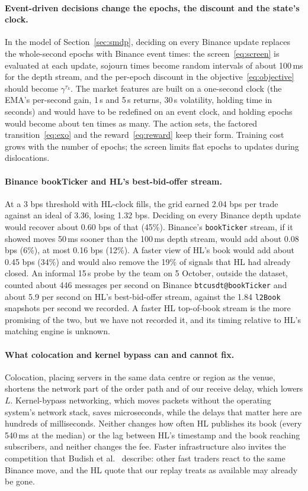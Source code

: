 \documentclass[12pt,a4paper]{article}
\DeclareRobustCommand{\bps}{\ifmmode\,\text{bps}\else\,bps\fi}
\begin{document}
\paragraph{Event-driven decisions change the epochs, the discount and the state's clock.} In
the model of Section~\ref{sec:smdp}, deciding on every Binance update replaces the
whole-second epochs with Binance event times: the screen~\eqref{eq:screen} is evaluated at each
update, sojourn times become random intervals of about 100\,ms for the depth stream, and the
per-epoch discount in the objective~\eqref{eq:objective} should become $\gamma^{\tau_k}$. The
market features are built on a one-second clock (the EMA's per-second gain, 1\,s and 5\,s
returns, 30\,s volatility, holding time in seconds) and would have to be redefined on an event
clock, and holding epochs would become about ten times as many. The action sets, the factored
transition~\eqref{eq:exo} and the reward~\eqref{eq:reward} keep their form. Training cost grows
with the number of epochs; the screen limits flat epochs to updates during dislocations.

\paragraph{Binance bookTicker and HL's best-bid-offer stream.} At a 3\bps{} threshold with HL-clock
fills, the grid earned 2.04\bps{} per trade against an ideal of 3.36, losing 1.32\bps. Deciding
on every Binance depth update would recover about 0.60\bps{} of that (45\%). Binance's
\texttt{bookTicker} stream, if it showed moves 50\,ms sooner than the 100\,ms depth stream,
would add about 0.08\bps{} (6\%), at most 0.16\bps{} (12\%). A faster view of HL's book would
add about 0.45\bps{} (34\%) and would also remove the 19\% of signals that HL had already
closed. An informal 15\,s probe by the team on 5 October, outside the dataset, counted about
446 messages per second on Binance \texttt{btcusdt@bookTicker} and about 5.9 per second on
HL's best-bid-offer stream, against the 1.84 \texttt{l2Book} snapshots per second we recorded.
A faster HL top-of-book stream is the more promising of the two, but we have not recorded it,
and its timing relative to HL's matching engine is unknown.

\paragraph{What colocation and kernel bypass can and cannot fix.} Colocation, placing servers in
the same data centre or region as the venue, shortens the network part of the order path and of
our receive delay, which lowers $L$. Kernel-bypass networking, which moves packets without the
operating system's network stack, saves microseconds, while the delays that matter here are hundreds of
milliseconds. Neither changes how often HL publishes its book (every 540\,ms at the median) or
the lag between HL's timestamp and the book reaching subscribers, and neither changes the fee.
Faster infrastructure also invites the competition that Budish et al.~\cite{budish} describe:
other fast traders react to the same Binance move, and the HL quote that our replay treats as
available may already be gone.
\end{document}
